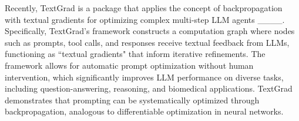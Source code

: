 Recently, TextGrad is a package that applies the concept of backpropagation with textual gradients for optimizing complex multi-step LLM agents ____. Specifically, TextGrad's framework constructs a computation graph where nodes such as prompts, tool calls, and responses receive textual feedback from LLMs, functioning as ``textual gradients" that inform iterative refinements. The framework allows for automatic prompt optimization without human intervention, which significantly improves LLM performance on diverse tasks, including question-answering, reasoning, and biomedical applications. TextGrad demonstrates that prompting can be systematically optimized through backpropagation, analogous to differentiable optimization in neural networks.